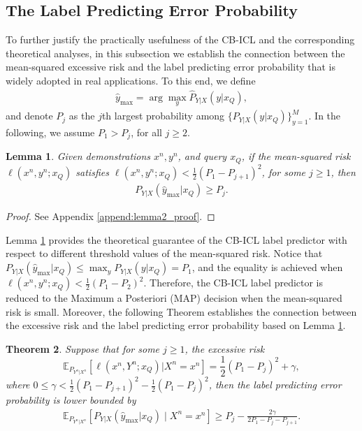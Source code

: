 \documentclass{article} %
\theoremstyle{plain} %
\newtheorem{theorem}{Theorem}[section]      %
\newtheorem{lemma}[theorem]{Lemma}          %
\begin{document}
\subsection{The Label Predicting Error Probability }

To further justify the practically usefulness of the CB-ICL and the corresponding theoretical analyses, in this subsection we establish the connection between the mean-squared excessive risk and the label predicting error probability that is widely adopted in real applications. To this end, we define
\begin{align}\label{equ:label_predictor}
\hat{y}_{\max} = \arg\max_y \hat{P}_{Y|X}(y|x_Q),
\end{align}
and denote $P_j$ as the $j$th largest probability among $\{P_{Y|X}(y|x_Q)\}_{y=1}^M$. In the following, we assume $P_1 > P_j$, for all $j \ge 2$.

\begin{lemma}\label{lem:lebel_pred_error}
Given demonstrations $x^n, y^n$, and query $x_Q$, if the mean-squared risk $\ell(x^n,y^n;x_Q)$ satisfies $\ell(x^n,y^n;x_Q) < \frac12 \left( P_1 - P_{j+1}\right)^2$, for some $j\geq 1$, then
\begin{align}
P_{Y|X}(\hat{y}_{\max}|x_Q)\geq P_j.
\end{align}
\end{lemma}
\begin{proof}
    See Appendix \ref{append:lemma2_proof}.
\end{proof}

Lemma \ref{lem:lebel_pred_error} provides the theoretical guarantee of the CB-ICL label predictor with respect to different threshold values of the mean-squared risk. Notice that $P_{Y|X}(\hat{y}_{\max}|x_Q) \leq \max_y P_{Y|X}(y|x_Q) = P_1$, and the equality is achieved when $\ell(x^n,y^n;x_Q) < \frac12 \left( P_1 - P_{2}\right)^2$. Therefore, the CB-ICL label predictor is reduced to the Maximum a Posteriori (MAP) decision when the mean-squared risk is small. Moreover, the following Theorem establishes the connection between the excessive risk and the label predicting error probability based on Lemma \ref{lem:lebel_pred_error}.
\begin{theorem}\label{thm:error_prob}
Suppose that for some $j \geq 1$, the excessive risk 
\begin{equation*}
    \mathbb{E}_{P_{Y^n|X^n}}\left[ 
\ell \left(x^n,Y^n;x_Q\right) | X^n = x^n\right] = \frac12 (P_1-P_{j})^2 + \gamma,
\end{equation*}
where $0 \leq \gamma < \frac12 (P_1-P_{j+1})^2 - \frac12 (P_1-P_{j})^2$, then the label predicting error probability is lower bounded by
\begin{align}
\mathbb{E}_{P_{Y^n|X^n}}\left[P_{Y|X}(\hat{y}_{\max}|x_Q)\mid X^n=x^n\right] \ge P_j - 
\frac{2\gamma}{2P_1-P_j-P_{j+1}}.
\end{align}
\end{theorem} 
\end{document}
